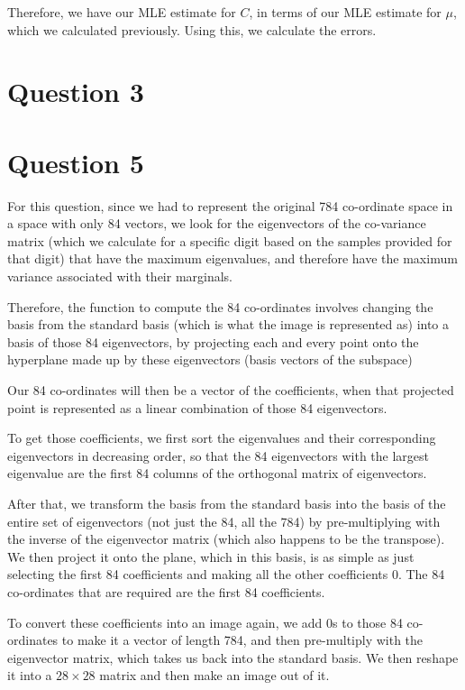 \documentclass{article}
\begin{document}
 
 Therefore, we have our MLE estimate for $C$, in terms of our MLE estimate for $\mu$, which we calculated previously. Using this, we calculate the errors.


\section{Question 3}


\section{Question 5}

For this question, since we had to represent the original 784 co-ordinate space in a space with only 84 vectors, we look for the eigenvectors of the co-variance matrix (which we calculate for a specific digit based on the samples provided for that digit) that have the maximum eigenvalues, and therefore have the maximum variance associated with their marginals.

Therefore, the function to compute the 84 co-ordinates involves changing the basis from the standard basis (which is what the image is represented as) into a basis of those 84 eigenvectors, by projecting each and every point onto the hyperplane made up by these eigenvectors (basis vectors of the subspace)

Our 84 co-ordinates will then be a vector of the coefficients, when that projected point is represented as a linear combination of those 84 eigenvectors.

To get those coefficients, we first sort the eigenvalues and their corresponding eigenvectors in decreasing order, so that the 84 eigenvectors with the largest eigenvalue are the first 84 columns of the orthogonal matrix of eigenvectors.

After that, we transform the basis from the standard basis into the basis of the entire set of eigenvectors (not just the 84, all the 784) by pre-multiplying with the inverse of the eigenvector matrix (which also happens to be the transpose). We then project it onto the plane, which in this basis, is as simple as just selecting the first 84 coefficients and making all the other coefficients 0. The 84 co-ordinates that are required are the first 84 coefficients.

To convert these coefficients into an image again, we add 0s to those 84 co-ordinates to make it a vector of length 784, and then pre-multiply with the eigenvector matrix, which takes us back into the standard basis. We then reshape it into a $28 \times 28$ matrix and then make an image out of it.
\end{document}

